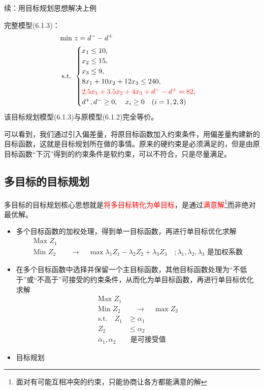 \begin{exbox}{续：用目标规划思想解决上例}{}
\begin{itemize}
        完整模型(6.1.3)：
        \begin{align*}
            \text{min } & z = d^- - d^+ \\
            \text{s.t. } & 
            \begin{cases} 
                x_1 \leq 10, \\ 
                x_2 \leq 15, \\ 
                x_3 \leq 9, \\ 
                8x_1 + 10x_2 + 12x_3 \leq 240, \\
                \textcolor{red}{2.5x_1 + 3.5x_2 + 4x_3 + d^- - d^+ = 82}, \\
                d^+, d^- \geq 0, \quad x_i \geq 0 \quad (i=1,2,3)
            \end{cases}
        \end{align*}
        该目标规划模型(6.1.3)与原模型(6.1.2)完全等价。
    \end{itemize}
    \end{exbox}
    可以看到，我们通过引入偏差量，将原目标函数加入约束条件，用偏差量构建新的目标函数，这就是目标规划所在做的事情。原来的硬约束是必须满足的，但是由原目标函数“下沉”得到的约束条件是软约束，可以不符合，只是尽量满足。
    
    
    
    

    
    
    \subsection{多目标的目标规划}
    多目标的目标规划核心思想就是\textcolor{red}{将多目标转化为单目标}，是通过\textcolor{red}{满意解}\footnote{面对有可能互相冲突的约束，只能协商让各方都能满意的解}而非绝对最优解。
    \begin{itemize}
        \item 多个目标函数的加权处理，得到单一目标函数，再进行单目标优化求解
        \begin{align*}
            \text{Max } Z_1 \\
            \text{Min } Z_2 & \quad \longrightarrow \quad \max \lambda_1 Z_1 - \lambda_2 Z_2 + \lambda_3 Z_3 \quad ; \lambda_1, \lambda_2, \lambda_3 \text{ 是加权系数}
        \end{align*}
        \item 在多个目标函数中选择并保留一个主目标函数，其他目标函数处理为“不低于”或“不高于”可接受的约束条件，从而化为单目标函数，再进行单目标优化求解
        \begin{align*}
            \text{Max } Z_1 \\
            \text{Min } Z_2 & \quad \longrightarrow \quad \max Z_3 \\
            \text{s.t.} \quad Z_1 & \geq \alpha_1 \\
            Z_2 & \leq \alpha_2 \\
            \alpha_1, \alpha_2 & \text{ 是可接受值}
        \end{align*}
        \item 目标规划
    \end{itemize}

